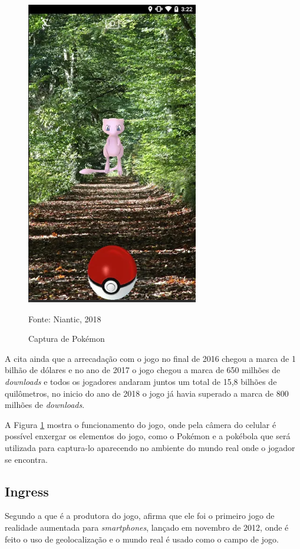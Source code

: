 	\begin{figure}[H]
		\centering
		\includegraphics[scale=0.6]{imagens/pokemongo}
		\caption{Captura de Pokémon}
		Fonte: Niantic, 2018
		\label{fig:pokemongo}
	\end{figure}
	
	A  cita ainda que a arrecadação com o jogo no final de 2016 chegou a marca de 1 bilhão de dólares e no ano de 2017 o jogo chegou a marca de 650 milhões de \textit{downloads} e todos os jogadores andaram juntos um total de 15,8 bilhões de quilômetros, no inicio do ano de 2018 o jogo já havia superado a marca de 800 milhões de \textit{downloads}.
	
	A Figura \ref{fig:pokemongo} mostra o funcionamento do jogo, onde pela câmera do celular é possível enxergar os elementos do jogo, como o Pokémon e a pokébola que será utilizada para captura-lo aparecendo no ambiente do mundo real onde o jogador se encontra.
	
	\subsection{Ingress}
	Segundo a  que é a produtora do jogo, afirma que ele foi o primeiro jogo de realidade aumentada para \textit{smartphones}, lançado em novembro de 2012, onde é feito o uso de geolocalização e o mundo real é usado como o campo de jogo.
	
